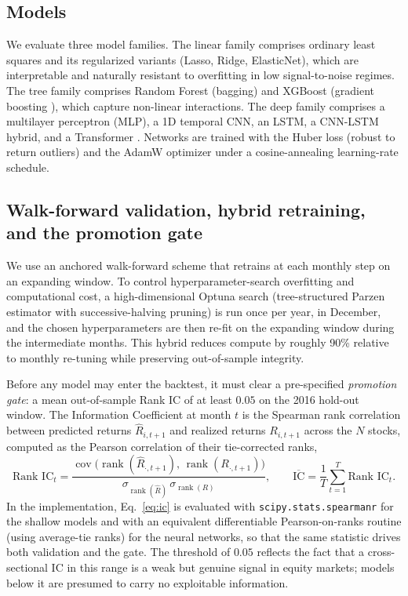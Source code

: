 \documentclass[11pt]{article}
\begin{document}
\subsection{Models}
We evaluate three model families. The linear family comprises ordinary least squares and its
regularized variants (Lasso, Ridge, ElasticNet), which are interpretable and naturally resistant
to overfitting in low signal-to-noise regimes. The tree family comprises Random Forest (bagging)
and XGBoost (gradient boosting \citep{chen2016xgboost}), which capture non-linear interactions.
The deep family comprises a multilayer perceptron (MLP), a 1D temporal CNN, an LSTM, a CNN-LSTM
hybrid, and a Transformer \citep{vaswani2017attention}. Networks are trained with the Huber loss
(robust to return outliers) and the AdamW optimizer under a cosine-annealing learning-rate
schedule.

\subsection{Walk-forward validation, hybrid retraining, and the promotion gate}
We use an anchored walk-forward scheme that retrains at each monthly step on an expanding window.
To control hyperparameter-search overfitting and computational cost, a high-dimensional Optuna
\citep{akiba2019optuna} search (tree-structured Parzen estimator with successive-halving pruning)
is run once per year, in December, and the chosen hyperparameters are then re-fit on the expanding
window during the intermediate months. This hybrid reduces compute by roughly 90\% relative to
monthly re-tuning while preserving out-of-sample integrity.

Before any model may enter the backtest, it must clear a pre-specified \emph{promotion gate}: a
mean out-of-sample Rank IC of at least $0.05$ on the 2016 hold-out window. The Information
Coefficient at month $t$ is the Spearman rank correlation between predicted returns
$\hat R_{i,t+1}$ and realized returns $R_{i,t+1}$ across the $N$ stocks, computed as the Pearson
correlation of their tie-corrected ranks,
\begin{equation}
\text{Rank IC}_t = \frac{\operatorname{cov}\!\big(\operatorname{rank}(\hat R_{\cdot,t+1}),\,
\operatorname{rank}(R_{\cdot,t+1})\big)}
{\sigma_{\operatorname{rank}(\hat R)}\,\sigma_{\operatorname{rank}(R)}},
\qquad
\overline{\text{IC}} = \frac{1}{T}\sum_{t=1}^{T}\text{Rank IC}_t .
\label{eq:ic}
\end{equation}
In the implementation, Eq.~\eqref{eq:ic} is evaluated with \texttt{scipy.stats.spearmanr} for the
shallow models and with an equivalent differentiable Pearson-on-ranks routine (using average-tie
ranks) for the neural networks, so that the same statistic drives both validation and the gate.
The threshold of $0.05$ reflects the fact that a cross-sectional IC in this range is a weak but
genuine signal in equity markets; models below it are presumed to carry no exploitable
information.
\end{document}
